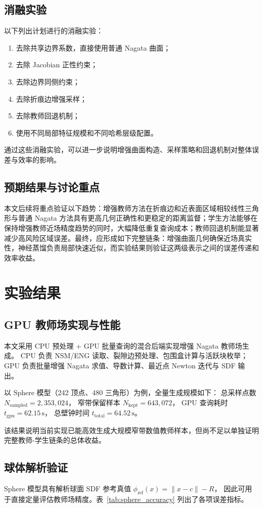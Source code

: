 \documentclass[12pt,oneside]{ctexbook}
\begin{document}
\section{消融实验}
以下列出计划进行的消融实验：
\begin{enumerate}[label=\arabic*)]
  \item 去除共享边界系数，直接使用普通 Nagata 曲面；
  \item 去除 Jacobian 正性约束；
  \item 去除边界同侧约束；
  \item 去除折痕边增强采样；
  \item 去除教师回退机制；
  \item 使用不同局部特征规模和不同哈希层级配置。
\end{enumerate}
通过这些消融实验，可以进一步说明增强曲面构造、采样策略和回退机制对整体误差与效率的影响。

\section{预期结果与讨论重点}
本文后续将重点验证以下趋势：增强教师方法在折痕边和近表面区域相较线性三角形与普通 Nagata 方法具有更高几何正确性和更稳定的距离监督；学生方法能够在保持增强教师近场精度趋势的同时，大幅降低重复查询成本；教师回退机制能显著减少高风险区域误差。最终，应形成如下完整链条：增强曲面几何确保近场真实性，神经蒸馏负责局部快速近似，而实验结果则验证这两级表示之间的误差传递和效率收益。


\chapter{实验结果}
\section{GPU 教师场实现与性能}
本文采用 CPU 预处理 + GPU 批量查询的混合后端实现增强 Nagata 教师场生成。
CPU 负责 NSM/ENG 读取、裂隙边预处理、包围盒计算与活跃块枚举；
GPU 负责批量增强 Nagata 求值、导数计算、最近点 Newton 迭代与 SDF 输出。

以 Sphere 模型（242 顶点、480 三角形）为例，全量生成规模如下：
总采样点数 $N_{\mathrm{sampled}}=2,353,024$，
窄带保留样本 $N_{\mathrm{kept}}=643,072$，
GPU 查询耗时 $t_{\mathrm{gpu}}=62.15\,\mathrm{s}$，
总壁钟时间 $t_{\mathrm{total}}=64.52\,\mathrm{s}$。

该结果说明当前实现已能高效生成大规模窄带数值教师样本，但尚不足以单独证明完整教师-学生链条的总体收益。

\section{球体解析验证}
Sphere 模型具有解析球面 SDF 参考真值 $\phi_{\mathrm{ref}}(x)=\|x-c\|-R$，
因此可用于直接定量评估教师场精度。表~\ref{tab:sphere_accuracy}
列出了各项误差指标。
\end{document}
